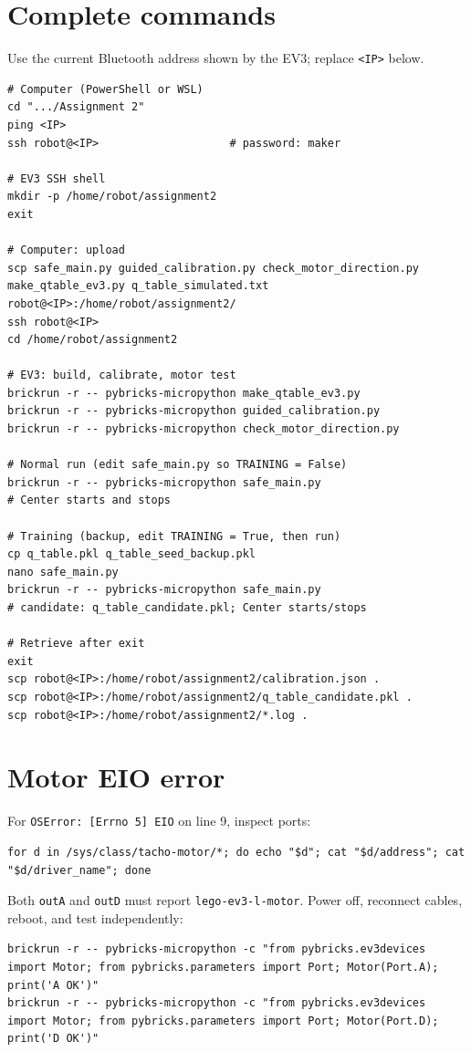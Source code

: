 \documentclass[11pt]{article}
\begin{document}
\section{Complete commands}
Use the current Bluetooth address shown by the EV3; replace \texttt{<IP>} below.
\begin{lstlisting}
# Computer (PowerShell or WSL)
cd ".../Assignment 2"
ping <IP>
ssh robot@<IP>                    # password: maker

# EV3 SSH shell
mkdir -p /home/robot/assignment2
exit

# Computer: upload
scp safe_main.py guided_calibration.py check_motor_direction.py make_qtable_ev3.py q_table_simulated.txt robot@<IP>:/home/robot/assignment2/
ssh robot@<IP>
cd /home/robot/assignment2

# EV3: build, calibrate, motor test
brickrun -r -- pybricks-micropython make_qtable_ev3.py
brickrun -r -- pybricks-micropython guided_calibration.py
brickrun -r -- pybricks-micropython check_motor_direction.py

# Normal run (edit safe_main.py so TRAINING = False)
brickrun -r -- pybricks-micropython safe_main.py
# Center starts and stops

# Training (backup, edit TRAINING = True, then run)
cp q_table.pkl q_table_seed_backup.pkl
nano safe_main.py
brickrun -r -- pybricks-micropython safe_main.py
# candidate: q_table_candidate.pkl; Center starts/stops

# Retrieve after exit
exit
scp robot@<IP>:/home/robot/assignment2/calibration.json .
scp robot@<IP>:/home/robot/assignment2/q_table_candidate.pkl .
scp robot@<IP>:/home/robot/assignment2/*.log .
\end{lstlisting}
\section{Motor EIO error}
For \texttt{OSError: [Errno 5] EIO} on line 9, inspect ports:
\begin{lstlisting}
for d in /sys/class/tacho-motor/*; do echo "$d"; cat "$d/address"; cat "$d/driver_name"; done
\end{lstlisting}
Both \texttt{outA} and \texttt{outD} must report \texttt{lego-ev3-l-motor}. Power off, reconnect cables, reboot, and test independently:
\begin{lstlisting}
brickrun -r -- pybricks-micropython -c "from pybricks.ev3devices import Motor; from pybricks.parameters import Port; Motor(Port.A); print('A OK')"
brickrun -r -- pybricks-micropython -c "from pybricks.ev3devices import Motor; from pybricks.parameters import Port; Motor(Port.D); print('D OK')"
\end{lstlisting}
\end{document}
